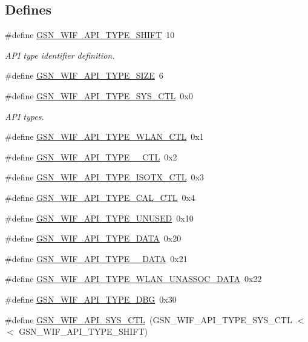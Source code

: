 \subsection*{Defines}
\begin{DoxyCompactItemize}
\item 
\#define \hyperlink{a00636_ga3c3fb4bb2d829ffe7098bdd4ee283a42}{GSN\_\-WIF\_\-API\_\-TYPE\_\-SHIFT}~10
\begin{DoxyCompactList}\small\item\em API type identifier definition. \end{DoxyCompactList}\item 
\#define \hyperlink{a00606_ad352ae019596522d3c81180b30376724}{GSN\_\-WIF\_\-API\_\-TYPE\_\-SIZE}~6
\item 
\#define \hyperlink{a00636_ga1bd275f0a8f47dba99b6e22adcb67ca4}{GSN\_\-WIF\_\-API\_\-TYPE\_\-SYS\_\-CTL}~0x0
\begin{DoxyCompactList}\small\item\em API types. \end{DoxyCompactList}\item 
\#define \hyperlink{a00606_a98e877f872668c98c0704efa914d7d17}{GSN\_\-WIF\_\-API\_\-TYPE\_\-WLAN\_\-CTL}~0x1
\item 
\#define \hyperlink{a00606_a2df8a6bf01c3126db06c5aeddf23e5be}{GSN\_\-WIF\_\-API\_\-TYPE\_\_\-CTL}~0x2
\item 
\#define \hyperlink{a00606_ac0be4ec4d6df42203ffe9726642c57c3}{GSN\_\-WIF\_\-API\_\-TYPE\_\-ISOTX\_\-CTL}~0x3
\item 
\#define \hyperlink{a00606_ac93423f7f5f2de5551ddd87f5bbe304f}{GSN\_\-WIF\_\-API\_\-TYPE\_\-CAL\_\-CTL}~0x4
\item 
\#define \hyperlink{a00606_a7feac063dca4c720cff1a1d4c90386c5}{GSN\_\-WIF\_\-API\_\-TYPE\_\-UNUSED}~0x10
\item 
\#define \hyperlink{a00606_a727f31d47220e310a75e7c1689ec6c43}{GSN\_\-WIF\_\-API\_\-TYPE\_\-DATA}~0x20
\item 
\#define \hyperlink{a00606_a6a88e175f21c3151d20d1e6d8d521243}{GSN\_\-WIF\_\-API\_\-TYPE\_\_\-DATA}~0x21
\item 
\#define \hyperlink{a00606_a128a138e12d8546c58af101ae73dafc9}{GSN\_\-WIF\_\-API\_\-TYPE\_\-WLAN\_\-UNASSOC\_\-DATA}~0x22
\item 
\#define \hyperlink{a00606_ac32fa2de29fe87b7f1a6087a3243b8d4}{GSN\_\-WIF\_\-API\_\-TYPE\_\-DBG}~0x30
\item 
\#define \hyperlink{a00606_a681c57c3ba88deec4991fdd5717fa2cc}{GSN\_\-WIF\_\-API\_\-SYS\_\-CTL}~(GSN\_\-WIF\_\-API\_\-TYPE\_\-SYS\_\-CTL $<$$<$ GSN\_\-WIF\_\-API\_\-TYPE\_\-SHIFT)
$$
\end{DoxyCompactItemize}
